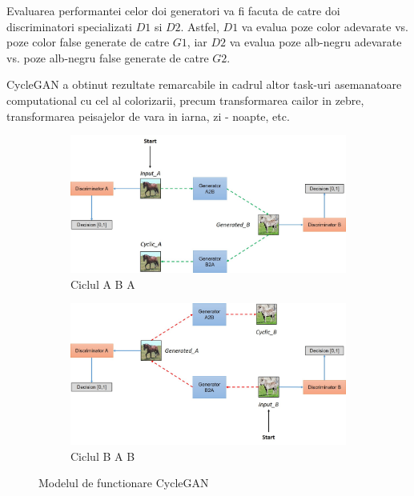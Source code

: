 \documentclass[12pt]{article}
\theoremstyle{definition}
\begin{document}
Evaluarea performantei celor doi generatori va fi facuta de catre doi discriminatori specializati $D1$ si $D2$. Astfel, $D1$ va evalua poze color adevarate vs. poze color false generate de catre $G1$, iar $D2$ va evalua poze alb-negru adevarate vs. poze alb-negru false generate de catre $G2$.

CycleGAN a obtinut rezultate remarcabile in cadrul altor task-uri asemanatoare computational cu cel al colorizarii, precum transformarea cailor in zebre, transformarea peisajelor de vara in iarna, zi - noapte, etc.

\begin{figure}[H]
  \centering

	\begin{subfigure}{0.4\textwidth}
	    \centering
		\includegraphics[width=\linewidth]{model.jpg}
		\caption{Ciclul A \Rightarrow B \Rightarrow A}
	\end{subfigure}
	\vspace{1em}
	\begin{subfigure}{0.4\textwidth}
		\centering
		\includegraphics[width=\linewidth]{model1.jpg}
		\caption{Ciclul B \Rightarrow A \Rightarrow B}
	\end{subfigure}

  \caption{Modelul de functionare CycleGAN}
  \label{fig:architecture}
\end{figure}
\end{document}
